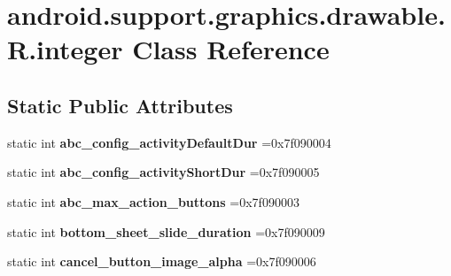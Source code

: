 \hypertarget{classandroid_1_1support_1_1graphics_1_1drawable_1_1R_1_1integer}{}\section{android.\+support.\+graphics.\+drawable.\+R.\+integer Class Reference}
\label{classandroid_1_1support_1_1graphics_1_1drawable_1_1R_1_1integer}
\subsection*{Static Public Attributes}
\begin{DoxyCompactItemize}
\item 
\mbox{\label{classandroid_1_1support_1_1graphics_1_1drawable_1_1R_1_1integer_a34c36a808d21479815e949277757a91c}} 
static int {\bfseries abc\+\_\+config\+\_\+activity\+Default\+Dur} =0x7f090004
\item 
\mbox{\label{classandroid_1_1support_1_1graphics_1_1drawable_1_1R_1_1integer_af668efcd280d80501fca92661a753285}} 
static int {\bfseries abc\+\_\+config\+\_\+activity\+Short\+Dur} =0x7f090005
\item 
\mbox{\label{classandroid_1_1support_1_1graphics_1_1drawable_1_1R_1_1integer_a5838c93d1a5adfdcbc1537ff25808a28}} 
static int {\bfseries abc\+\_\+max\+\_\+action\+\_\+buttons} =0x7f090003
\item 
\mbox{\label{classandroid_1_1support_1_1graphics_1_1drawable_1_1R_1_1integer_a9a01fbcaba1b78509d22b4eb710fec24}} 
static int {\bfseries bottom\+\_\+sheet\+\_\+slide\+\_\+duration} =0x7f090009
\item 
\mbox{\label{classandroid_1_1support_1_1graphics_1_1drawable_1_1R_1_1integer_a7cac2c0f72cd724a6bde4211e46796bb}} 
static int {\bfseries cancel\+\_\+button\+\_\+image\+\_\+alpha} =0x7f090006
\item 
\mbox{\label{classandroid_1_1support_1_1graphics_1_1drawable_1_1R_1_1integer_a4de319c387c99a1563d770434f2815a1}} 

\end{DoxyCompactItemize}

